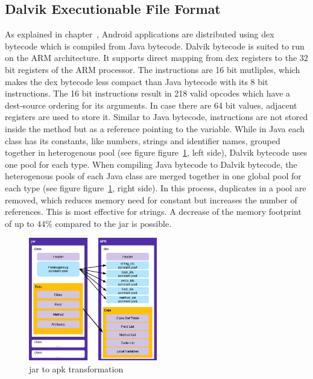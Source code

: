 \subsection{Dalvik Executionable File Format} \label{subsection:android-dex}
As explained in chapter~\cite{subsection:foundation-android-package}, Android applications are distributed using dex bytecode which is compiled from Java bytecode.
Dalvik bytecode is suited to run on the ARM architecture.
It supports direct mapping from dex registers to the 32 bit registers of the ARM processor.
The instructions are 16 bit mutliples, which makes the dex bytecode less compact than Java bytecode with its 8 bit instructions.
The 16 bit instructions result in 218 valid opcodes which have a dest-source ordering for its arguments. \cite{androidDalvik}
In case there are 64 bit values, adjacent registers are used to store it.
\newline
Similar to Java bytecode, instructions are not stored inside the method but as a reference pointing to the variable.
While in Java each class has its constants, like numbers, strings and identifier names, grouped together in heterogenous pool (see figure figure~\ref{fig:java}, left side), Dalvik bytecode uses one pool for each type.
When compiling Java bytecode to Dalvik bytecode,
the heterogenous pools of each Java class are merged together in one global pool for each type (see figure figure~\ref{fig:java}, right side).
In this process, duplicates in a pool are removed, which reduces memory need for constant but increases the number of references.
This is most effective for strings.
A decrease of the memory footprint of up to 44\% compared to the \gls{jar} is possible.
\newline
\begin{figure}[h]
    \centering
    \includegraphics[width=0.5\textwidth]{data/java.png}
    \caption{\gls{jar} to \gls{apk} transformation \cite{googleDalvik}}
    \label{fig:java}
\end{figure}
